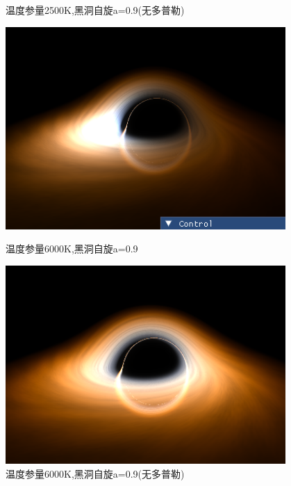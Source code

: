 \documentclass[a4paper, 12pt]{article}
\begin{document}
\begin{figure}[H]
\begin{minipage}[t]{0.48\textwidth}
            \caption{温度参量2500K,黑洞自旋a=0.9(无多普勒)}
        \end{minipage}
        \begin{minipage}[t]{0.48\textwidth}
            \centering
            \includegraphics[width=0.95\textwidth]{photo/6kT.png}
            \caption{温度参量6000K,黑洞自旋a=0.9}
        \end{minipage}
        \hfill
        \begin{minipage}[t]{0.48\textwidth}
            \centering
            \includegraphics[width=0.95\textwidth]{photo/6kT_ND.png}
            \caption{温度参量6000K,黑洞自旋a=0.9(无多普勒)}
        \end{minipage}
        \begin{minipage}[t]{0.48\textwidth}
            \centering

\end{minipage}
\end{figure}
\end{document}
